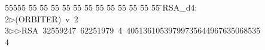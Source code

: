 %
%
\begin{tabbing}
55555 \= 55 \= 55 \= 55 \= 55 \= 55 \= 55 \= 55 \= 55 \= 55 \= 55 \= 55 \= 55 \= \>RSA\_d4:\\[0pt]
2\>$\triangleright$\>(ORBITER)\ v\ 2\ \\[0pt]
3\>$\triangleright$\>$\triangleright$\>RSA\ 32559247\ 62251979\ 4\ 40513610539799735644967635068535\\[0pt]
4\>\end{tabbing}
